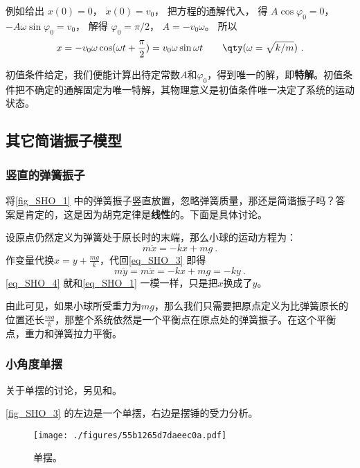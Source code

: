 例如给出 $x(0) = 0$，  $\dot x(0) = v_0$， 把方程的通解代入， 得 $A\cos \varphi_0 = 0$，  $ - A\omega \sin \varphi_0 = v_0$， 解得 $\varphi_0 = \pi /2$，  $A =  -v_0\omega $。 所以
\begin{equation}
x =  - v_0\omega \cos (\omega t + \frac{\pi }{2}) = v_0\omega \sin \omega t \qquad \qty(\omega  = \sqrt{k/m})~.
\end{equation}

初值条件给定，我们便能计算出待定常数$A$和$\varphi_0$，得到唯一的解，即\textbf{特解}。初值条件把不确定的通解固定为唯一特解，其物理意义是初值条件唯一决定了系统的运动状态。


\subsection{其它简谐振子模型}

\subsubsection{竖直的弹簧振子}

将\autoref{fig_SHO_1} 中的弹簧振子竖直放置，忽略弹簧质量，那还是简谐振子吗？答案是肯定的，这是因为胡克定律是\textbf{线性}的。下面是具体讨论。

设原点仍然定义为弹簧处于原长时的末端，那么小球的运动方程为：
\begin{equation}\label{eq_SHO_3}
m\ddot{x} = -kx+mg~.
\end{equation}
作变量代换$x=y+\frac{mg}{k}$，代回\autoref{eq_SHO_3} 即得
\begin{equation}\label{eq_SHO_4}
m\ddot{y} = m\ddot{x} = -kx+mg = -ky~.
\end{equation}
\autoref{eq_SHO_4} 就和\autoref{eq_SHO_1} 一模一样，只是把$x$换成了$y$。

由此可见，如果小球所受重力为$mg$，那么我们只需要把原点定义为比弹簧原长的位置还长$\frac{mg}{k}$，那整个系统依然是一个平衡点在原点处的弹簧振子。在这个平衡点，重力和弹簧拉力平衡。


\subsubsection{小角度单摆}

关于单摆的讨论，另见和。

\autoref{fig_SHO_3} 的左边是一个单摆，右边是摆锤的受力分析。

\begin{figure}[ht]
\centering
\texttt{[image: ./figures/55b1265d7daeec0a.pdf]}
\caption{单摆。} \label{fig_SHO_3}
\end{figure}

